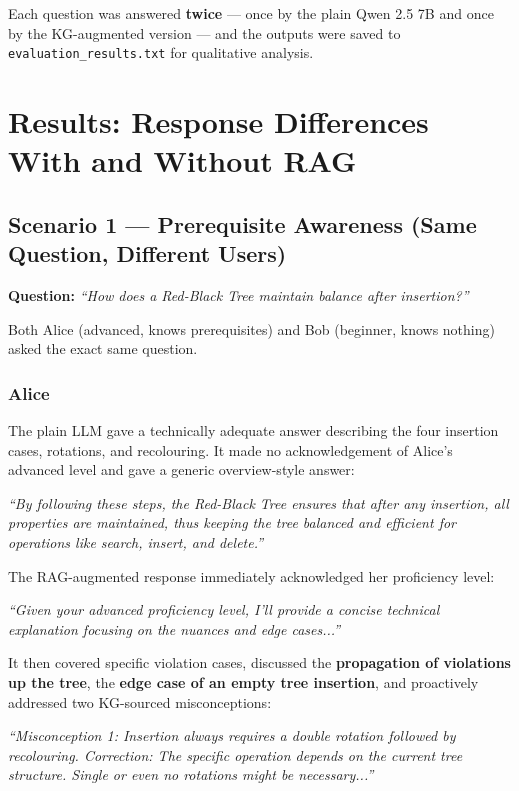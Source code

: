 \documentclass[12pt,a4paper]{article}
\newenvironment{ragbox}[1]{%
  \begin{tcolorbox}[
    title={\textbf{#1}},
    colback=ragbg,
    colframe=ragborder,
    colbacktitle=ragborder,
    coltitle=white,
    left=6pt, right=6pt, top=4pt, bottom=4pt,
    boxrule=0.5pt,
    arc=3pt,
    fonttitle=\small\bfseries,
    breakable,
  ]
  \small
}{%
  \end{tcolorbox}
}
\newenvironment{plainbox}[1]{%
  \begin{tcolorbox}[
    title={\textbf{#1}},
    colback=plainbg,
    colframe=plainborder,
    colbacktitle=plainborder,
    coltitle=white,
    left=6pt, right=6pt, top=4pt, bottom=4pt,
    boxrule=0.5pt,
    arc=3pt,
    fonttitle=\small\bfseries,
    breakable,
  ]
  \small
}{%
  \end{tcolorbox}
}
\begin{document}
Each question was answered \textbf{twice} --- once by the plain Qwen 2.5 7B and
once by the KG-augmented version --- and the outputs were saved to
\texttt{evaluation\_results.txt} for qualitative analysis.

\section{Results: Response Differences With and Without RAG}

\subsection{Scenario 1 --- Prerequisite Awareness (Same Question, Different Users)}

\textbf{Question:} \textit{``How does a Red-Black Tree maintain balance after
insertion?''}

Both Alice (advanced, knows prerequisites) and Bob (beginner, knows nothing)
asked the exact same question.

\subsubsection{Alice}

\begin{plainbox}{WITHOUT RAG --- Alice (Advanced)}
The plain LLM gave a technically adequate answer describing the four insertion
cases, rotations, and recolouring. It made no acknowledgement of Alice's
advanced level and gave a generic overview-style answer:

\medskip
\textit{``By following these steps, the Red-Black Tree ensures that after any
insertion, all properties are maintained, thus keeping the tree balanced and
efficient for operations like search, insert, and delete.''}
\end{plainbox}

\begin{ragbox}{WITH RAG --- Alice (Advanced)}
The RAG-augmented response immediately acknowledged her proficiency level:

\medskip
\textit{``Given your advanced proficiency level, I'll provide a concise
technical explanation focusing on the nuances and edge cases...''}

\medskip
It then covered specific violation cases, discussed the \textbf{propagation of
violations up the tree}, the \textbf{edge case of an empty tree insertion}, and
proactively addressed two KG-sourced misconceptions:

\medskip
\textit{``Misconception 1: Insertion always requires a double rotation followed
by recolouring. Correction: The specific operation depends on the current tree
structure. Single or even no rotations might be necessary...''}
\end{ragbox}
\end{document}
